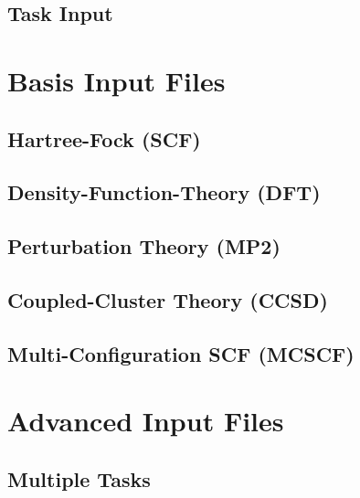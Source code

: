 \documentclass[letterpaper,12pt]{article}
\begin{document}
\newpage

\subsection{Task Input}\label{sec:TaskInput}

\newpage

\section{Basis Input Files}\label{sec:BasisInputFiles}

\newpage

\subsection{Hartree-Fock (SCF)}\label{sec:HartreeFock}

\newpage

\subsection{Density-Function-Theory (DFT)}\label{sec:DensityFunctionTheory}

\newpage

\subsection{Perturbation Theory (MP2)}\label{sec:PerturbationTheory}

\newpage

\subsection{Coupled-Cluster Theory (CCSD)}\label{sec:CoupledClusterTheory}

\newpage

\subsection{Multi-Configuration SCF (MCSCF)}\label{sec:MultiConfigurationSCF}

\newpage

\section{Advanced Input Files}\label{sec:AdvancedInputFiles}

\newpage

\subsection{Multiple Tasks}\label{sec:MultipleTasks}
\end{document}

